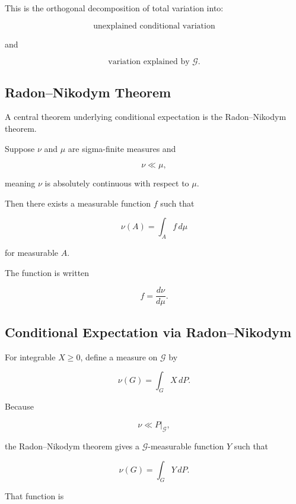 This is the orthogonal decomposition of total variation into:

\[
\boxed{
\text{unexplained conditional variation}
}
\]

and

\[
\boxed{
\text{variation explained by }\mathcal{G}.
}
\]

\subsection{Radon--Nikodym Theorem}
\label{subsec:radon-nikodym-probability}

A central theorem underlying conditional expectation is the
Radon--Nikodym theorem.

\begin{theorem}
Suppose \(\nu\) and \(\mu\) are sigma-finite measures and

\[
\nu\ll\mu,
\]

meaning \(\nu\) is absolutely continuous with respect to \(\mu\).

Then there exists a measurable function \(f\) such that

\[
\boxed{
\nu(A)
=
\int_A
f\,d\mu
}
\]

for measurable \(A\).

The function is written

\[
\boxed{
f
=
\frac{d\nu}{d\mu}.
}
\]
\end{theorem}

\subsection{Conditional Expectation via Radon--Nikodym}
\label{subsec:conditional-radon-nikodym}

For integrable \(X\geq0\), define a measure on \(\mathcal{G}\) by

\[
\nu(G)
=
\int_G
X\,dP.
\]

Because

\[
\nu\ll P|_{\mathcal{G}},
\]

the Radon--Nikodym theorem gives a \(\mathcal{G}\)-measurable function
\(Y\) such that

\[
\nu(G)
=
\int_G
Y\,dP.
\]

That function is


